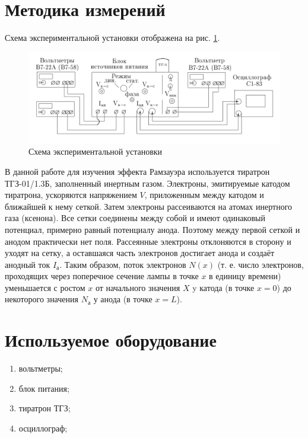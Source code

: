\documentclass[a4paper, 12pt]{article}
\begin{document}
\section{Методика измерений}

Схема экспериментальной установки отображена на рис. \ref{fig:screenshot3}.
\begin{figure}[h!]
	\centering
	\includegraphics[width=1.0\linewidth]{Screenshot_3}
	\caption{Схема экспериментальной установки}
	\label{fig:screenshot3}
\end{figure}

В данной работе для изучения эффекта Рамзауэра используется
тиратрон ТГЗ-01/1.3Б, заполненный инертным газом. Электроны, эмитируемые катодом тиратрона, ускоряются напряжением $ V $, приложенным между катодом и ближайшей к нему сеткой. Затем электроны рассеиваются на атомах инертного газа (ксенона). Все сетки соединены между собой и имеют одинаковый потенциал, примерно равный потенциалу анода. Поэтому между первой сеткой и анодом практически нет поля. Рассеянные электроны отклоняются в сторону и уходят на сетку, а оставшаяся часть электронов достигает анода и создаёт анодный ток $ I_а $. Таким образом, поток электронов $ N(x) $ (т. е. число электронов, проходящих через поперечное сечение лампы в точке $ x $ в единицу времени) уменьшается с ростом $ x $ от начального значения $ X $ y катода (в точке $ x=0 $) до некоторого значения $ N_а $ у анода (в точке
$ x=L $).

\section{Используемое оборудование}

\begin{enumerate}
    \item вольтметры;
    \item блок питания;
    \item тиратрон ТГЗ;
    \item осциллограф;
\end{enumerate}
\end{document}

